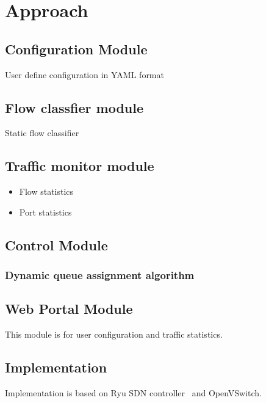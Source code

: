 \section{Approach}
\label{sect:approach}
\subsection{Configuration Module}
User define configuration in YAML format
\subsection{Flow classfier module}
Static flow classifier
\subsection{Traffic monitor module}
\begin{itemize}
\item Flow statistics
\item Port statistics
\end{itemize}
\subsection{Control Module}
\subsubsection{Dynamic queue assignment algorithm}
\subsection{Web Portal Module}
This module is for user configuration and traffic statistics.
\subsection{Implementation}
Implementation is based on Ryu SDN controller~\cite{ryu} and OpenVSwitch.
